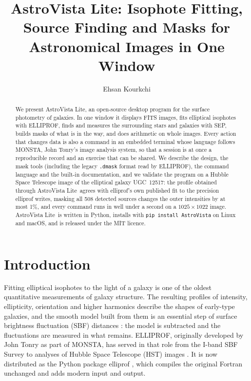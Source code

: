 \documentclass[twocolumn]{aastex701}
\newcommand{\avl}{AstroVista Lite}
\newcommand{\code}[1]{\texttt{#1}}
\begin{document}
\title{AstroVista Lite: Isophote Fitting, Source Finding and Masks for Astronomical
Images in One Window}

\author[0000-0002-5514-3354]{Ehsan Kourkchi}

\begin{abstract}
We present \avl, an open-source desktop program for the surface photometry of galaxies.
In one window it displays FITS images, fits elliptical isophotes with ELLIPROF, finds and
measures the surrounding stars and galaxies with SEP, builds masks of what is in the way,
and does arithmetic on whole images. Every action that changes data is also a command in
an embedded terminal whose language follows MONSTA, John Tonry's image analysis system,
so that a session is at once a reproducible record and an exercise that can be shared. We
describe the design, the mask tools (including the legacy \code{.dmask} format read by
ELLIPROF), the command language and the built-in documentation, and we validate the
program on a Hubble Space Telescope image of the elliptical galaxy UGC~12517: the profile
obtained through \avl\ agrees with elliprof's own published fit to the precision elliprof
writes, masking all 508 detected sources changes the outer intensities by at most 1\%, and
every command runs in well under a second on a $1025\times1022$ image. \avl\ is written in
Python, installs with \code{pip install AstroVista} on Linux and macOS, and is released
under the MIT licence.
\end{abstract}


\section{Introduction} \label{sec:intro}

Fitting elliptical isophotes to the light of a galaxy \citep{Jedrzejewski1987} is one of
the oldest quantitative measurements of galaxy structure. The resulting profiles of
intensity, ellipticity, orientation and higher harmonics describe the shapes of early-type
galaxies, and the smooth model built from them is an essential step of surface brightness
fluctuation (SBF) distances \citep{Tonry1988}: the model is subtracted and the fluctuations
are measured in what remains. ELLIPROF, originally developed by John Tonry as part of
MONSTA, has served in that role from the I-band SBF Survey \citep{Tonry1997} to analyses of
Hubble Space Telescope (HST) images \citep{Jordan2004,Mei2005,Jensen2021}. It is now
distributed as the Python package elliprof \citep{elliprof}, which compiles the original
Fortran unchanged and adds modern input and output.
\end{document}
